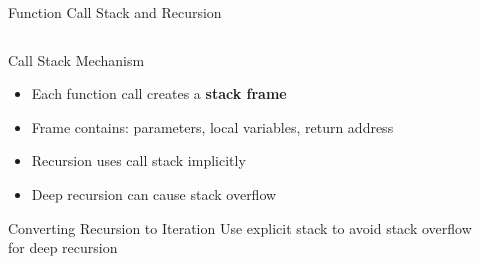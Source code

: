 \documentclass[aspectratio=169,xcolor=dvipsnames]{beamer}
\begin{document}
\begin{frame}{Function Call Stack and Recursion}
  \begin{columns}
    \begin{column}{0.55\textwidth}
      \begin{block}{Call Stack Mechanism}
        \begin{itemize}
          \item Each function call creates a \textbf{stack frame}
          \item Frame contains: parameters, local variables, return address
          \item Recursion uses call stack implicitly
          \item Deep recursion can cause stack overflow
        \end{itemize}
      \end{block}
      
      \begin{alertblock}{Converting Recursion to Iteration}
        Use explicit stack to avoid stack overflow for deep recursion
      \end{alertblock}
    \end{column}
    \begin{column}{0.4\textwidth}
    \end{column}
  \end{columns}
\end{frame}
\end{document}

